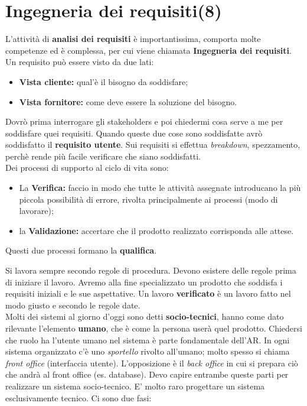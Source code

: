 


\section{Ingegneria dei requisiti(8)}

L'attività di \textbf{analisi dei requisiti} è importantissima, comporta molte competenze ed è complessa, per cui viene chiamata \textbf{Ingegneria dei requisiti}. Un requisito può essere visto da due lati:

\begin{itemize}

	\item \textbf{Vista cliente:} qual'è il bisogno da soddisfare;
	\item \textbf{Vista fornitore:} come deve essere la soluzione del bisogno.

\end{itemize}

Dovrò prima interrogare gli stakeholders e poi chiedermi cosa serve a me per soddisfare quei requisiti. Quando queste due cose sono soddisfatte avrò soddisfatto il \textbf{requisito utente}. Sui requisiti si effettua \textit{breakdown}, spezzamento, perchè rende più facile verificare che siano soddisfatti.\\

Dei processi di supporto al ciclo di vita sono:
\begin{itemize}

	\item La \textbf{Verifica:} faccio in modo che tutte le attività assegnate introducano la più piccola possibilità di errore, rivolta principalmente ai processi (modo di lavorare);
	\item la \textbf{Validazione:} accertare che il prodotto realizzato corrisponda alle attese.

\end{itemize}

Questi due processi formano la \textbf{qualifica}.

Si lavora sempre secondo regole di procedura. Devono esistere delle regole prima di iniziare il lavoro. Avremo alla fine specializzato un prodotto che soddisfa i requisiti iniziali e le sue aspettative. Un lavoro \textbf{verificato} è un lavoro fatto nel modo giusto e secondo le regole date. \\

Molti dei sistemi al giorno d'oggi sono detti \textbf{socio-tecnici}, hanno come dato rilevante l'elemento \textbf{umano}, che è come la persona userà quel prodotto. Chiedersi che ruolo ha l'utente umano nel sistema è parte fondamentale dell'AR. In ogni sistema organizzato c'è uno \textit{sportello} rivolto all'umano; molto spesso si chiama \textit{front office} (interfaccia utente). L'opposizione è il \textit{back office} in cui si prepara ciò che andrà al front office (es. database). Devo capire entrambe queste parti per realizzare un sistema socio-tecnico. E' molto raro progettare un sistema esclusivamente tecnico. Ci sono due fasi:

